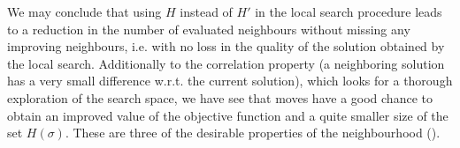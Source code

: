 \documentclass[preprint]{elsarticle}
\begin{document}
We may conclude that using $H$ instead of $H'$ in the local search procedure leads to a reduction in the number of evaluated neighbours without missing any improving neighbours, i.e. with no loss in the quality of the solution obtained by the local search. Additionally to the correlation property (a neighboring solution has a very small difference w.r.t. the current solution), which looks for a thorough exploration of the search space, we have see that moves have a good chance to obtain an improved value of the objective function and a quite smaller size of the set $H(\sigma)$. These are three of the desirable properties of the neighbourhood (\cite{Mattfeld1995}).

\end{document}
